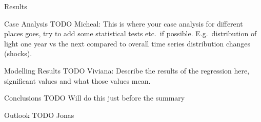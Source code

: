 \documentclass[12pt,fleqn,leqno,letterpaper]{article}
\begin{document}
\begin{section}{Results}
  \begin{subsection}{Case Analysis}
    TODO Micheal: This is where your case analysis for different places goes, try to add some statistical tests etc.\ if possible. E.g.\ distribution of light one year vs the next compared to overall time series distribution changes (shocks).
  \end{subsection}
  \begin{subsection}{Modelling Results}
    TODO Viviana: Describe the results of the regression here, significant values and what those values mean.
  \end{subsection}
  \begin{subsection}{Conclusions}
    TODO Will do this just before the summary
  \end{subsection}
  \begin{subsection}{Outlook}
    TODO Jonas
  \end{subsection}
\end{section}


\end{document}
